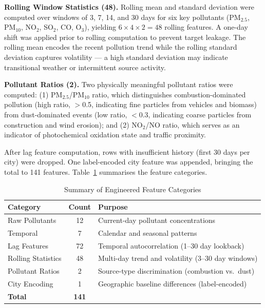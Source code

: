 \documentclass[12pt,a4paper]{report}
\begin{document}
\textbf{Rolling Window Statistics (48).} Rolling mean and standard deviation were computed over windows of 3, 7, 14, and 30 days for six key pollutants (PM$_{2.5}$, PM$_{10}$, NO$_2$, SO$_2$, CO, O$_3$), yielding $6 \times 4 \times 2 = 48$ rolling features. A one-day shift was applied prior to rolling computation to prevent target leakage. The rolling mean encodes the recent pollution trend while the rolling standard deviation captures volatility --- a high standard deviation may indicate transitional weather or intermittent source activity.

\textbf{Pollutant Ratios (2).} Two physically meaningful pollutant ratios were computed: (1) PM$_{2.5}$/PM$_{10}$ ratio, which distinguishes combustion-dominated pollution (high ratio, $>$0.5, indicating fine particles from vehicles and biomass) from dust-dominated events (low ratio, $<$0.3, indicating coarse particles from construction and wind erosion); and (2) NO$_2$/NO ratio, which serves as an indicator of photochemical oxidation state and traffic proximity.

After lag feature computation, rows with insufficient history (first 30 days per city) were dropped. One label-encoded city feature was appended, bringing the total to 141 features. Table~\ref{tab:feature_summary} summarises the feature categories.

\begin{table}[H]
\centering
\caption{Summary of Engineered Feature Categories}
\label{tab:feature_summary}
\begin{tabular}{|l|c|p{6.5cm}|}
\hline
\textbf{Category} & \textbf{Count} & \textbf{Purpose} \\
\hline
Raw Pollutants & 12 & Current-day pollutant concentrations \\
\hline
Temporal & 7 & Calendar and seasonal patterns \\
\hline
Lag Features & 72 & Temporal autocorrelation (1--30 day lookback) \\
\hline
Rolling Statistics & 48 & Multi-day trend and volatility (3--30 day windows) \\
\hline
Pollutant Ratios & 2 & Source-type discrimination (combustion vs.\ dust) \\
\hline
City Encoding & 1 & Geographic baseline differences (label-encoded) \\
\hline
\textbf{Total} & \textbf{141} & \\
\hline
\end{tabular}
\end{table}
\end{document}
